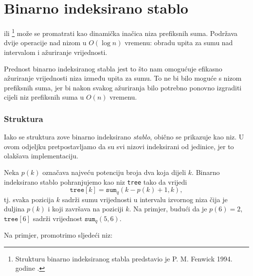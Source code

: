 \section{Binarno indeksirano stablo}


 ili \footnote{Strukturu
binarno indeksiranog stabla predstavio je P. M. Fenwick 1994. godine \cite{fen94}.}
može se promatrati kao dinamička inačica niza prefiksnih suma.
Podržava dvije operacije nad nizom u $O(\log n)$ vremenu:
obradu upita za sumu nad intervalom i ažuriranje vrijednosti.

Prednost binarno indeksiranog stabla jest
to što nam omogućuje efikasno ažuriranje
vrijednosti niza između upita za sumu.
To ne bi bilo moguće s nizom prefiksnih suma,
jer bi nakon svakog ažuriranja bilo potrebno ponovno izgraditi
cijeli niz prefiksnih suma u $O(n)$ vremenu.

\subsubsection{Struktura}

Iako se struktura zove binarno indeksirano \emph{stablo},
obično se prikazuje kao niz.
U ovom odjeljku pretpostavljamo da su svi nizovi indeksirani od jedinice,
jer to olakšava implementaciju.

Neka $p(k)$ označava najveću potenciju broja dva koja
dijeli $k$.
Binarno indeksirano stablo pohranjujemo kao niz \texttt{tree}
tako da vrijedi
\[ \texttt{tree}[k] = \texttt{sum}_q(k-p(k)+1,k),\]
tj. svaka pozicija $k$ sadrži sumu vrijednosti
u intervalu izvornog niza čija je duljina $p(k)$
i koji završava na poziciji $k$.
Na primjer, budući da je $p(6)=2$, $\texttt{tree}[6]$
sadrži vrijednost $\texttt{sum}_q(5,6)$.

Na primjer, promotrimo sljedeći niz:
\begin{center}
\end{center}

